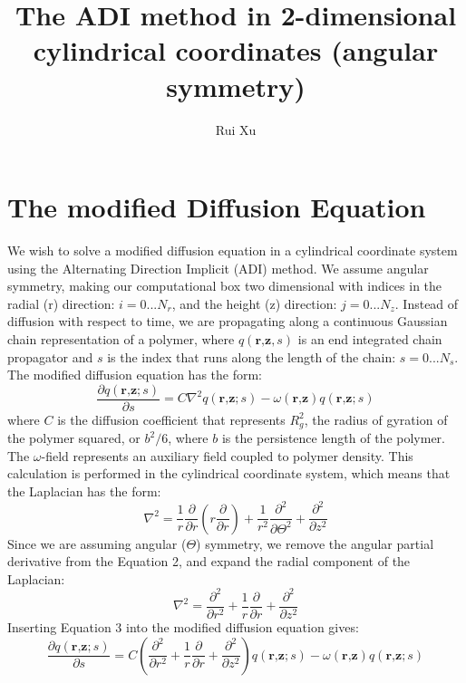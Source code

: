 \documentclass[11pt]{article} %
\title{The ADI method in 2-dimensional cylindrical coordinates (angular symmetry)}
\author{Rui Xu}
\begin{document}
\maketitle

\section*{The modified Diffusion Equation}
 
 We wish to solve a modified diffusion equation in a cylindrical coordinate system using the Alternating Direction Implicit (ADI) method. We assume angular symmetry, making our computational box two dimensional with indices in the radial (r) direction: $i = 0 ... N_r$, and the height (z) direction: $j = 0 ... N_z$. Instead of diffusion with respect to time, we are propagating along a continuous Gaussian chain representation of a polymer, where $q(\textbf{r,z}, s)$ is an end integrated chain propagator and $s$ is the index that runs along the length of the chain: $s = 0 ... N_s$. The modified diffusion equation has the form: 
 \begin{equation}
\frac{\partial q(\textbf{r,z}; s)}{\partial s} = C \nabla^2 q(\textbf{r,z}; s) - \omega (\textbf{r,z}) q(\textbf{r,z}; s)
 \end{equation}
\noindent
where $C$ is the diffusion coefficient that represents $R_g^2$, the radius of gyration of the polymer squared, or $b^2/6$, where $b$ is the persistence length of the polymer. The $\omega$-field represents an auxiliary field coupled to polymer density. This calculation is performed in the cylindrical coordinate system, which means that the Laplacian has the form:
\begin{equation}
\nabla^2 = \frac{1}{r} \frac{\partial}{\partial r} \left( r \frac{\partial}{\partial r} \right) + \frac{1}{r^2} \frac{\partial^2}{\partial \Theta^2} + \frac{\partial^2}{\partial z^2} 
\end{equation}
\noindent
Since we are assuming angular ($\Theta$) symmetry, we remove the angular partial derivative from the Equation 2, and expand the radial component of the Laplacian:
\begin{equation}
\nabla^2 = \frac{\partial^2}{\partial r^2} + \frac{1}{r} \frac{\partial}{\partial r}   + \frac{\partial^2}{\partial z^2}
\end{equation}
\noindent
Inserting Equation 3 into the modified diffusion equation gives:
\begin{equation}
\frac{\partial q(\textbf{r,z}; s)}{\partial s} = C \left(\frac{\partial^2}{\partial r^2} + \frac{1}{r} \frac{\partial}{\partial r}   + \frac{\partial^2}{\partial z^2} \right) q(\textbf{r,z}; s) - \omega (\textbf{r,z}) q(\textbf{r,z}; s)
\end{equation}\\[12pt]
\end{document}
